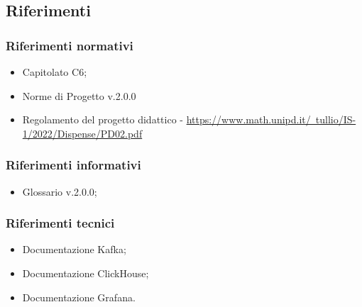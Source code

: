 \subsection{Riferimenti}
\subsubsection{Riferimenti normativi}
\begin{itemize}
    \item Capitolato C6;
    \item Norme di Progetto v.2.0.0
    \item  Regolamento del progetto didattico - \href{https://www.math.unipd.it/~tullio/IS-1/2022/Dispense/PD02.pdf}{https://www.math.unipd.it/~tullio/IS-1/2022/Dispense/PD02.pdf}
\end{itemize}
\subsubsection{Riferimenti informativi}
\begin{itemize}
    \item Glossario v.2.0.0;
\end{itemize}
\subsubsection{Riferimenti tecnici}
\begin{itemize}
    \item Documentazione Kafka;
    \item Documentazione ClickHouse;
    \item Documentazione Grafana.
\end{itemize}
